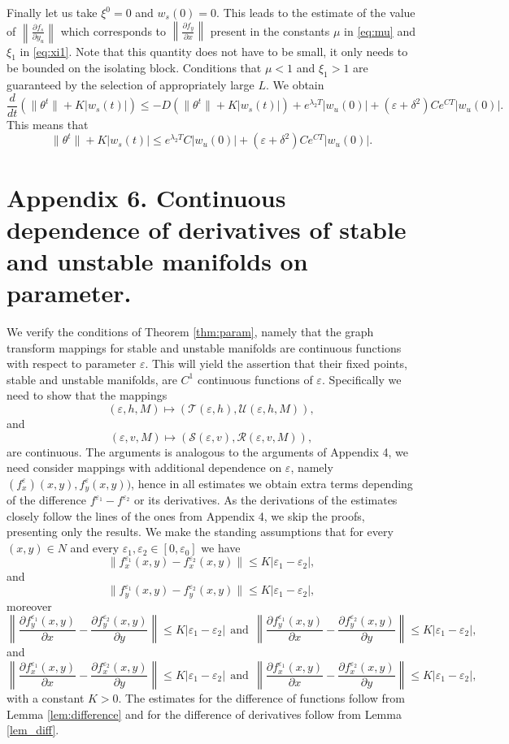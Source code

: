 \documentclass[11pt, leqno]{amsart}
\theoremstyle{definition}
\begin{document}
Finally let us take $\xi^0=0$ and $w_s(0)=0$. This leads to the estimate of the value of $\left\|\frac{\partial f_s}{\partial y_u}\right\|$ which corresponds to $\left\|\frac{\partial f_y}{\partial x}\right\|$ present in the constants $\mu$ in \eqref{eq:mu} and $\xi_1$ in \eqref{eq:xi1}. Note that this quantity does not have to be small, it only needs to be bounded on the isolating block. Conditions that $\mu<1$ and $\xi_1>1$ are guaranteed by the selection of appropriately large $L$.   We obtain
$$
\frac{d}{dt}(\|\theta ^t\|+K|w_s(t)|)\leq - D(\|\theta^t\|+ K|w_s(t)|)+e^{\lambda_2T}|w_u(0)|+(\varepsilon+\delta^2) Ce^{CT}|w_u(0)|. $$
This means that
$$
\|\theta ^t\|+K|w_s(t)|\leq e^{\lambda_2T}C|w_u(0)|+(\varepsilon+\delta^2) Ce^{CT}|w_u(0)|.
$$

\section{Appendix 6. Continuous dependence of derivatives of stable and unstable manifolds on parameter.}

We verify the conditions of Theorem \ref{thm:param}, namely that the graph transform mappings for stable and unstable manifolds are continuous functions with respect to parameter $\varepsilon$. This will yield the assertion that their fixed points,  stable and unstable manifolds, are $C^1$ continuous functions of $\varepsilon$. Specifically we need to show that the mappings
$$
(\varepsilon,h,M)\mapsto (\mathcal{T}(\varepsilon,h),\mathcal{U}(\varepsilon,h,M)),
$$
and
$$
(\varepsilon,v,M)\mapsto (\mathcal{S}(\varepsilon,v),\mathcal{R}(\varepsilon,v,M)),
$$
are continuous. The arguments is analogous to the arguments of Appendix 4, we need consider mappings with additional dependence on $\varepsilon$, namely $(f_x^\varepsilon)(x,y),f_y^\varepsilon(x,y))$, hence in all estimates we obtain extra terms depending of the difference $f^{\varepsilon_1}-f^{\varepsilon_2}$ or its derivatives. As the derivations of the estimates  closely follow the lines of the ones from Appendix 4, we skip the proofs, presenting only the results.  We make the standing assumptions that for every $(x,y)\in N$ and every $\varepsilon_1, \varepsilon_2\in [0,\varepsilon_0]$ we have
$$
\|f_x^{\varepsilon_1}(x,y)-f_x^{\varepsilon_2}(x,y)\|\leq K |\varepsilon_1-\varepsilon_2|,
$$
and
$$
\|f_y^{\varepsilon_1}(x,y)-f_y^{\varepsilon_2}(x,y)\|\leq K |\varepsilon_1-\varepsilon_2|,
$$
moreover
$$
\left\|\frac{\partial f_y^{\varepsilon_1}(x,y)}{\partial x}-\frac{\partial f_y^{\varepsilon_2}(x,y)}{\partial y}\right\|\leq K |\varepsilon_1-\varepsilon_2| \ \ \textrm{and}\ \ \left\|\frac{\partial f_y^{\varepsilon_1}(x,y)}{\partial x}-\frac{\partial f_y^{\varepsilon_2}(x,y)}{\partial y}\right\|\leq K |\varepsilon_1-\varepsilon_2|,
$$
and
$$
\left\|\frac{\partial f_x^{\varepsilon_1}(x,y)}{\partial x}-\frac{\partial f_x^{\varepsilon_2}(x,y)}{\partial y}\right\|\leq K |\varepsilon_1-\varepsilon_2| \ \ \textrm{and}\ \ \left\|\frac{\partial f_x^{\varepsilon_1}(x,y)}{\partial x}-\frac{\partial f_x^{\varepsilon_2}(x,y)}{\partial y}\right\|\leq K |\varepsilon_1-\varepsilon_2|,
$$
with a constant $K>0$. The estimates for the difference of functions follow from Lemma \ref{lem:difference} and for the difference of derivatives follow from Lemma \ref{lem_diff}.
\end{document}
